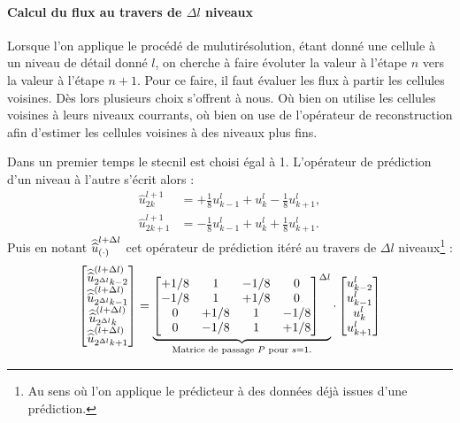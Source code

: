 \paragraph{Calcul du flux au travers de $\Delta l$ niveaux}
Lorsque l'on applique le procédé de mulutirésolution, étant donné une cellule à un niveau de détail donné $l$, on cherche à faire évoluter la valeur à l'étape $n$ vers la valeur à l'étape $n+1$. 
Pour ce faire, il faut évaluer les flux à partir les cellules voisines. Dès lors plusieurs choix s'offrent à nous. Où bien on utilise les cellules voisines à leurs niveaux courrants, où bien on use de l'opérateur 
de reconstruction afin d'estimer les cellules voisines à des niveaux plus fins.\par
Dans un premier temps le stecnil est choisi égal à 1. L'opérateur de prédiction d'un niveau à l'autre s'écrit alors : 
\begin{align}
    \hat u^{l+1}_{2k} &= +\frac{1}{8} u^l_{k-1} + u^l_k - \frac{1}{8} u^l_{k+1},\\
    \hat u^{l+1}_{2k+1} &= -\frac{1}{8} u^l_{k-1} + u^l_k + \frac{1}{8} u^l_{k+1}.
\end{align}
Puis en notant $\widehat{\widehat{u}}^{l+\Delta l}_{(\cdot)}$ cet opérateur de prédiction itéré au travers de $\Delta l$ niveaux\footnote{
    Au sens où l'on applique le prédicteur à des données déjà issues d'une prédiction.
} : 
\begin{align}
    \begin{bmatrix}
        \widehat{\widehat{u}}^{(l+\Delta l)}_{2^{\Delta l}k-2}\\
        \widehat{\widehat{u}}^{(l+\Delta l)}_{2^{\Delta l}k-1}\\
        \widehat{\widehat{u}}^{(l+\Delta l)}_{2^{\Delta l}k}\\
        \widehat{\widehat{u}}^{(l+\Delta l)}_{2^{\Delta l}k+1}\\
    \end{bmatrix}
        =
    \underbrace{
    \begin{bmatrix}
        +1/8 & 1 & -1/8 & 0 \\
        -1/8 & 1 & +1/8 & 0 \\
        0 & +1/8 & 1 & -1/8 \\
        0 & -1/8 & 1 & +1/8 
    \end{bmatrix}^{\Delta l}}_{\text{Matrice de passage } P \text{ pour }s=1.}
    \cdot
    \begin{bmatrix}
        u^l_{k-2}\\
        u^l_{k-1}\\
        u^l_{k}\\
        u^l_{k+1}\\
    \end{bmatrix}
\end{align}

